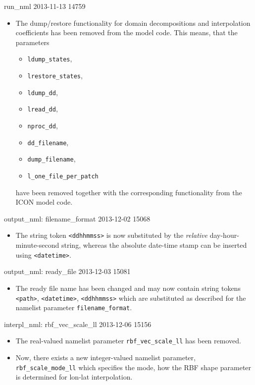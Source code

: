 \begin{changeitem}{run\_nml}{ 2013-11-13 }{ 14759 }
  \begin{itemize}
   \item The dump/restore functionality for domain decompositions and interpolation coefficients has
         been removed from the model code.
         This means, that the parameters
         \begin{itemize}
           \item \texttt{ldump\_states},
           \item \texttt{lrestore\_states},
           \item \texttt{ldump\_dd},
           \item \texttt{lread\_dd},
           \item \texttt{nproc\_dd},
           \item \texttt{dd\_filename},
           \item \texttt{dump\_filename},
           \item \texttt{l\_one\_file\_per\_patch}
         \end{itemize}
         have been removed together with the corresponding functionality from the ICON model code.
  \end{itemize}
\end{changeitem}

\begin{changeitem}{output\_nml: filename\_format }{ 2013-12-02 }{ 15068 }
  \begin{itemize}
   \item The string token \texttt{<ddhhmmss>} is now substituted by the \emph{relative} day-hour-minute-second
         string, whereas the absolute date-time stamp can be inserted using \texttt{<datetime>}.
  \end{itemize}
\end{changeitem}

\begin{changeitem}{output\_nml: ready\_file }{ 2013-12-03 }{ 15081 }
  \begin{itemize}
   \item The ready file name has been changed and may now contain
     string tokens \texttt{<path>}, \texttt{<datetime>},
     \texttt{<ddhhmmss>} which are substituted as described for the
     namelist parameter \texttt{filename\_format}.
  \end{itemize}
\end{changeitem}

\begin{changeitem}{interpl\_nml: rbf\_vec\_scale\_ll }{ 2013-12-06 }{ 15156 }
  \begin{itemize}
   \item The real-valued namelist parameter \texttt{rbf\_vec\_scale\_ll} has been removed.
   \item Now, there exists a new integer-valued namelist parameter, \texttt{rbf\_scale\_mode\_ll}
         which specifies the mode, how the RBF shape parameter is
         determined for lon-lat interpolation.
  \end{itemize}
\end{changeitem}

